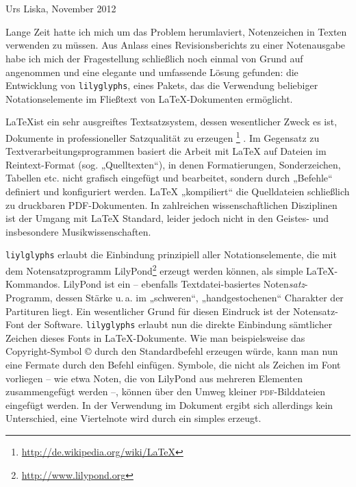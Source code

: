 \documentclass[DIV=13]{scrartcl}
\begin{document}
\section*{\centering\Huge\lilyglyphs[scale=1.3]}
\begin{flushright}
Urs Liska, November 2012
\end{flushright}
Lange Zeit hatte ich mich um das Problem herumlaviert, Notenzeichen in Texten verwenden zu müssen.
Aus Anlass eines Revisionsberichts zu einer Notenausgabe habe ich mich der Fragestellung schließlich noch einmal von Grund auf angenommen und eine elegante und umfassende Lösung gefunden: 
die Entwicklung von \texttt{lilyglyphs}, eines Pakets, das die Verwendung beliebiger Notationselemente im Fließtext von \LaTeX-Dokumenten ermöglicht.

\LaTeX ist ein sehr ausgreiftes Textsatzsystem, dessen wesentlicher Zweck es ist, Dokumente in professioneller Satzqualität zu erzeugen%
\footnote{\url{http://de.wikipedia.org/wiki/LaTeX}}%
.
Im Gegensatz zu Textverarbeitungsprogrammen basiert die Arbeit mit \LaTeX{} auf Dateien im Reintext-Format (sog. „Quelltexten“), in denen Formatierungen, Sonderzeichen, Tabellen etc. nicht grafisch eingefügt und bearbeitet, sondern durch „Befehle“ definiert und konfiguriert werden.
\LaTeX{} „kompiliert“ die Quelldateien schließlich zu druckbaren PDF-Dokumenten. 
In zahlreichen wissenschaftlichen Disziplinen ist der Umgang mit \LaTeX{} Standard, leider jedoch nicht in den Geistes- und insbesondere Musikwissenschaften.

\texttt{liylglyphs} erlaubt die Einbindung prinzipiell aller Notationselemente, die mit dem Notensatzprogramm LilyPond\footnote{\url{http://www.lilypond.org}} erzeugt werden können, als simple \LaTeX-Kommandos.
LilyPond ist ein -- ebenfalls Text\-datei-basiertes Noten\emph{satz}-Programm, dessen Stärke u.\,a. im „schweren“, „handgestochenen“ Charakter der Partituren liegt.
Ein wesentlicher Grund für diesen Eindruck ist der Notensatz-Font der Software.
\texttt{lilyglyphs} erlaubt nun die direkte Einbindung sämtlicher Zeichen dieses Fonts in \LaTeX-Doku\-mente.
Wie man beispielsweise das Copyright-Symbol \copyright{} durch den Standardbefehl  erzeugen würde, kann man nun eine Fermate \fermata durch den Befehl  einfügen.
Symbole, die nicht als Zeichen im Font vorliegen -- wie etwa Noten, die von LilyPond aus mehreren Elementen zusammengefügt werden --, können über den Umweg kleiner \textsc{pdf}-Bilddateien eingefügt werden.
In der Verwendung im Dokument ergibt sich allerdings kein Unterschied, eine Viertelnote \crotchet[scale=1.1] wird durch ein simples  erzeugt.
\end{document}
